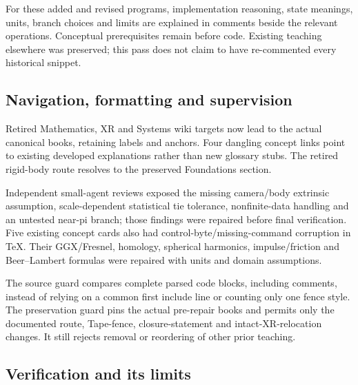 For these added and revised programs, implementation reasoning, state meanings, units, branch choices and limits are explained in comments beside the relevant operations. Conceptual prerequisites remain before code. Existing teaching elsewhere was preserved; this pass does not claim to have re-commented every historical snippet.

\subsection{Navigation, formatting and supervision}\label{appendix-faa2b5a8e820-navigation-formatting-and-supervision}

\hypertarget{appendix-faa2b5a8e820-navigation-formatting-and-supervision}{}

Retired Mathematics, XR and Systems wiki targets now lead to the actual canonical books, retaining labels and anchors. Four dangling concept links point to existing developed explanations rather than new glossary stubs. The retired rigid-body route resolves to the preserved Foundations section.

Independent small-agent reviews exposed the missing camera/body extrinsic assumption, scale-dependent statistical tie tolerance, nonfinite-data handling and an untested near-pi branch; those findings were repaired before final verification. Five existing concept cards also had control-byte/missing-command corruption in TeX. Their GGX/Fresnel, homology, spherical harmonics, impulse/friction and Beer--Lambert formulas were repaired with units and domain assumptions.

The source guard compares complete parsed code blocks, including comments, instead of relying on a common first include line or counting only one fence style. The preservation guard pins the actual pre-repair books and permits only the documented route, Tape-fence, closure-statement and intact-XR-relocation changes. It still rejects removal or reordering of other prior teaching.

\subsection{Verification and its limits}\label{appendix-faa2b5a8e820-verification-and-its-limits}

\hypertarget{appendix-faa2b5a8e820-verification-and-its-limits}{}

